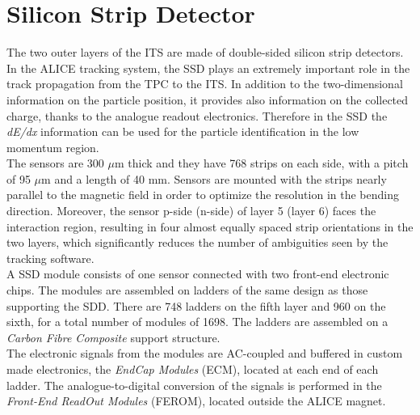 \section{Silicon Strip Detector}
The two outer layers of the ITS are made of double-sided silicon strip detectors. In the ALICE tracking system, the SSD plays an extremely important role in the track propagation from the TPC to the ITS. In addition to the two-dimensional information on the particle position, it provides also information on the collected charge, thanks to the analogue readout electronics. Therefore in the SSD the \textit{dE/dx} information can be used for the particle identification in the low momentum region.\\
The sensors are 300 $\mu$m thick and they have 768 strips on each side, with a pitch of 95 $\mu$m and a length of 40 mm. Sensors are mounted with the strips nearly parallel to the magnetic field in order to optimize the resolution in the bending direction. Moreover, the sensor p-side (n-side) of layer 5 (layer 6) faces the interaction region, resulting in four almost equally spaced strip orientations in the two layers, which significantly reduces the number of ambiguities seen by the tracking software.\\
A SSD module consists of one sensor connected with two front-end electronic chips. The modules are assembled on ladders of the same design as those supporting the SDD. There are 748 ladders on the fifth layer and 960 on the sixth, for a total number of modules of 1698. The ladders are assembled on a \textit{Carbon Fibre Composite} support structure.\\
The electronic signals from the modules are AC-coupled and buffered in custom made electronics, the \textit{EndCap Modules} (ECM), located at each end of each ladder. The analogue-to-digital conversion of the signals is performed in the \textit{Front-End ReadOut Modules} (FEROM), located outside the ALICE magnet.